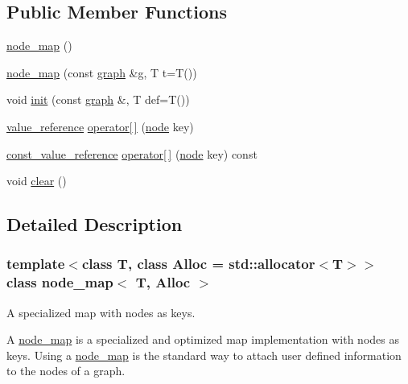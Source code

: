 \subsection*{Public Member Functions}
\begin{DoxyCompactItemize}
\item 
\mbox{\hyperlink{classnode__map_a7a4c767f07f348d31a1004776485d17b}{node\+\_\+map}} ()
\item 
\mbox{\hyperlink{classnode__map_a5bd24349e3a56379592889abbe4c6b09}{node\+\_\+map}} (const \mbox{\hyperlink{classgraph}{graph}} \&\mbox{\hyperlink{rings_8cpp_aa9df5aa3976a89a96a5f1c7611d42938}{g}}, T t=T())
\item 
void \mbox{\hyperlink{classne__map_a4ef2ab4aebcb57a7a101975bf6a88e24}{init}} (const \mbox{\hyperlink{classgraph}{graph}} \&, T def=T())
\item 
\mbox{\hyperlink{classne__map_a3de60750d102f8992a215b0fe645014d}{value\+\_\+reference}} \mbox{\hyperlink{classne__map_a4bcfa7ec2dcbfaa42fab93dfa81e8ab0}{operator\mbox{[}$\,$\mbox{]}}} (\mbox{\hyperlink{classnode}{node}} key)
\item 
\mbox{\hyperlink{classne__map_ad2be1a01de53940aee1282ec0e34f0f7}{const\+\_\+value\+\_\+reference}} \mbox{\hyperlink{classne__map_ad8d23cc924963ddff8267e625dcbffc6}{operator\mbox{[}$\,$\mbox{]}}} (\mbox{\hyperlink{classnode}{node}} key) const
\item 
void \mbox{\hyperlink{classne__map_aebe555c23769c6dcc869b5ac7fae6a9c}{clear}} ()
\end{DoxyCompactItemize}


\subsection{Detailed Description}
\subsubsection*{template$<$class T, class Alloc = std\+::allocator$<$\+T$>$$>$\newline
class node\+\_\+map$<$ T, Alloc $>$}

A specialized map with nodes as keys. 

A {\ttfamily \mbox{\hyperlink{classnode__map}{node\+\_\+map}}} is a specialized and optimized map implementation with nodes as keys. Using a {\ttfamily \mbox{\hyperlink{classnode__map}{node\+\_\+map}}} is the standard way to attach user defined information to the nodes of a {\ttfamily graph}.

